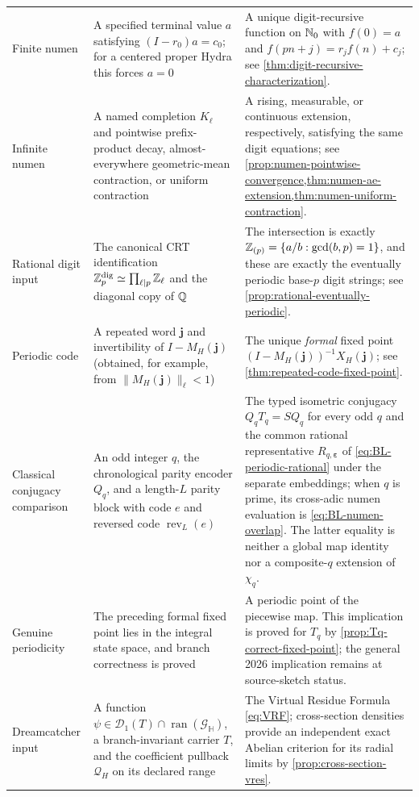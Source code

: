 \begin{longtable}{@{}p{}p{}p{}@{}}
 Finite numen & A specified terminal value $a$ satisfying
 $(I-r_0)a=c_0$; for a centered proper Hydra this forces $a=0$ & A unique
 digit-recursive function on $\mathbb N_0$ with $f(0)=a$ and
 $f(pn+j)=r_j f(n)+c_j$; see
 \cref{thm:digit-recursive-characterization}.\\

Infinite numen & A named completion $K_\ell$ and pointwise prefix-product
decay, almost-everywhere geometric-mean contraction, or uniform contraction
& A rising, measurable, or continuous extension, respectively, satisfying
the same digit equations; see
\cref{prop:numen-pointwise-convergence,thm:numen-ae-extension,thm:numen-uniform-contraction}.\\

Rational digit input & The canonical CRT identification
$\mathbb Z_p^{\mathrm{dig}}\simeq\prod_{\ell\mid p}\mathbb Z_\ell$ and the diagonal copy of
$\mathbb Q$ & The intersection is exactly
$\mathbb Z_{(p)}=\{a/b:\gcd(b,p)=1\}$, and these are exactly the eventually periodic
base-$p$ digit strings; see \cref{prop:rational-eventually-periodic}.\\

Periodic code & A repeated word $\mathbf j$ and invertibility of
$I-M_H(\mathbf j)$ (obtained, for example, from
$\|M_H(\mathbf j)\|_\ell<1$) & The unique \emph{formal} fixed point
$(I-M_H(\mathbf j))^{-1}X_H(\mathbf j)$; see
\cref{thm:repeated-code-fixed-point}.\\

Classical conjugacy comparison & An odd integer $q$, the chronological
parity encoder $Q_q$, and a length-$L$ parity block with code $e$ and reversed
code $\operatorname{rev}_L(e)$ & The typed isometric conjugacy
$Q_qT_q=SQ_q$ for every odd $q$ and the common rational representative
$R_{q,\boldsymbol\varepsilon}$ of \cref{eq:BL-periodic-rational} under the
separate embeddings; when $q$ is prime, its cross-adic numen evaluation is
\cref{eq:BL-numen-overlap}.  The latter equality is neither a global map
identity nor a composite-$q$ extension of $\chi_q$.\\

Genuine periodicity & The preceding formal fixed point lies in the integral
state space, and branch correctness is proved & A periodic point of the
piecewise map.  This implication is proved for $T_q$ by
\cref{prop:Tq-correct-fixed-point}; the general 2026 implication remains at
source-sketch status.\\

Dreamcatcher input & A function
$\psi\in\mathcal D_1(T)\cap\operatorname{ran}(\mathcal G_{\mathbb H})$, a
branch-invariant carrier $T$, and the coefficient pullback
$\mathscr Q_H$ on its declared range & The Virtual Residue Formula
\cref{eq:VRF}; cross-section densities provide an independent exact Abelian
criterion for its radial limits by \cref{prop:cross-section-vres}.\\


\end{longtable}
